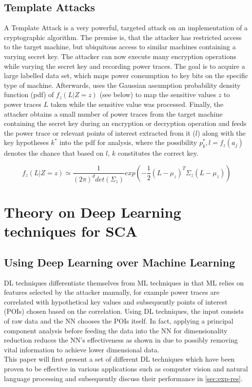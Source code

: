 \documentclass[journal]{IEEEtran}
\begin{document}
\subsection{Template Attacks}
\label{subsec:template}
A Template Attack is a very powerful, targeted attack on an implementation of a cryptographic algorithm. The premise is, that the attacker has restricted access to the target machine, but ubiquitous access to similar machines containing a varying secret key. The attacker can now execute many encryption operations while varying the secret key and recording power traces. The goal is to acquire a large labelled data set, which maps power consumption to key bits on the specific type of machine. Afterwards, uses the Gaussian assumption probability density function (pdf) of $ f_z(L|Z=z) $ (see below) to map the sensitive values $ z $ to power traces $ L $ taken while the sensitive value was processed. Finally, the attacker obtains a small number of power traces from the target machine containing the secret key during an encryption or decryption operation and feeds the power trace or relevant points of interest extracted from it ($ l $) along with the key hypotheses $ k^{*} $ into the pdf for analysis, where the possibility $ p_k^{*},l=f_z(a_j) $ denotes the chance that based on $ l $, $ k $ constitutes the correct key. 

$$ f_z(L|Z=z) \simeq \dfrac{1}{(2\pi)^{d}det(\Sigma_z)}exp(-\frac{1}{2}(L-\mu_z)^{T}\Sigma_z(L-\mu_z)) $$


\section{Theory on Deep Learning techniques for SCA}
\subsection{Using Deep Learning over Machine Learning}
DL techniques differentiate themselves from ML techniques in that ML relies on features selected by the attacker manually, for example power traces are correlated with hypothetical key values and subsequently points of interest (POIs) chosen based on the correlation. Using DL techniques, the input consists of raw data and the NN chooses the POIs itself. In fact, applying a principal component analysis before feeding the data into the NN for dimensionality reduction reduces the NN's effectiveness as shown in \cite[p.~15]{breaking-crypto-dl:prouff} due to possibly removing vital information to achieve lower dimensional data. \\
This paper will first present a set of different DL techniques which have been proven to be effective in various applications such as computer vision and natural language processing and subsequently discuss their performance in \autoref{sec:exp-res}.
\end{document}
